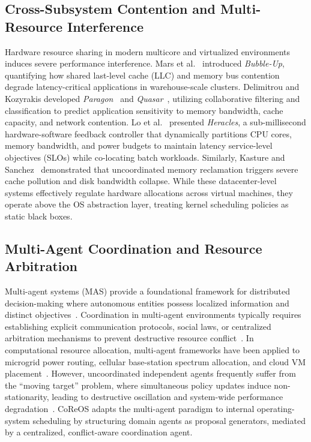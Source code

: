\documentclass[conference]{IEEEtran}
\begin{document}
\subsection{Cross-Subsystem Contention and Multi-Resource Interference}
Hardware resource sharing in modern multicore and virtualized environments induces severe performance interference. Mars et al.~\cite{mars2011bubble} introduced \textit{Bubble-Up}, quantifying how shared last-level cache (LLC) and memory bus contention degrade latency-critical applications in warehouse-scale clusters. Delimitrou and Kozyrakis developed \textit{Paragon}~\cite{delimitrou2013paragon} and \textit{Quasar}~\cite{delimitrou2014quasar}, utilizing collaborative filtering and classification to predict application sensitivity to memory bandwidth, cache capacity, and network contention. Lo et al.~\cite{lo2015heracles} presented \textit{Heracles}, a sub-millisecond hardware-software feedback controller that dynamically partitions CPU cores, memory bandwidth, and power budgets to maintain latency service-level objectives (SLOs) while co-locating batch workloads. Similarly, Kasture and Sanchez~\cite{kasture2014ubik} demonstrated that uncoordinated memory reclamation triggers severe cache pollution and disk bandwidth collapse. While these datacenter-level systems effectively regulate hardware allocations across virtual machines, they operate above the OS abstraction layer, treating kernel scheduling policies as static black boxes.

\subsection{Multi-Agent Coordination and Resource Arbitration}
Multi-agent systems (MAS) provide a foundational framework for distributed decision-making where autonomous entities possess localized information and distinct objectives~\cite{wooldridge2009introduction, stone2000multiagent}. Coordination in multi-agent environments typically requires establishing explicit communication protocols, social laws, or centralized arbitration mechanisms to prevent destructive resource conflict~\cite{panait2005cooperative, shoham2008multiagent}. In computational resource allocation, multi-agent frameworks have been applied to microgrid power routing, cellular base-station spectrum allocation, and cloud VM placement~\cite{zhang2021multi}. However, uncoordinated independent agents frequently suffer from the ``moving target'' problem, where simultaneous policy updates induce non-stationarity, leading to destructive oscillation and system-wide performance degradation~\cite{panait2005cooperative}. CoReOS adapts the multi-agent paradigm to internal operating-system scheduling by structuring domain agents as proposal generators, mediated by a centralized, conflict-aware coordination agent.
\end{document}
